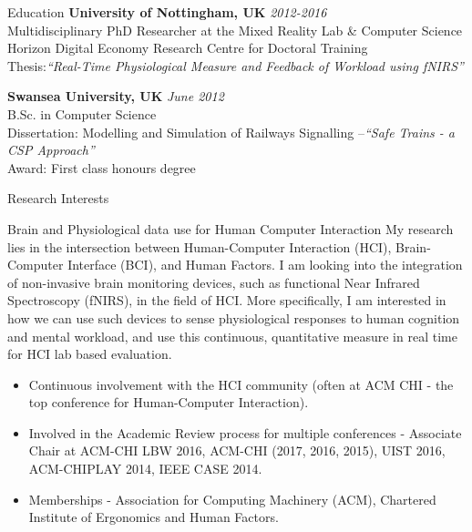 \documentclass{resume} %
\begin{document}

\begin{rSection}{Education}
{\bf University of Nottingham, UK} \hfill {\em 2012-2016} \\
Multidisciplinary PhD Researcher at the Mixed Reality Lab \& Computer Science \\
Horizon Digital Economy Research Centre for Doctoral Training \\
Thesis:\emph{``Real-Time Physiological Measure and Feedback of Workload using fNIRS''} \smallskip \\
\vspace{-1 mm}

{\bf Swansea University, UK} \hfill {\em June 2012} \\
B.Sc. in Computer Science \\
Dissertation: Modelling and Simulation of Railways Signalling –\emph{``Safe Trains - a CSP Approach''}\smallskip \\
Award: First class honours degree

\end{rSection}

\begin{rSection}{Research Interests}
\begin{rSubsection}{Brain and Physiological data use for Human Computer Interaction}{ }{ }{ }
\vspace{-5 mm}
My research lies in the intersection between Human-Computer Interaction (HCI), Brain-Computer
Interface (BCI), and Human Factors. I am looking into the integration of non-invasive
brain monitoring devices, such as functional Near Infrared Spectroscopy (fNIRS), in the field of HCI.
More specifically, I am interested in how we can use such devices to sense physiological responses to
human cognition and mental workload, and use this continuous, quantitative measure in real time for HCI lab based evaluation.

\begin{itemize}
  \item Continuous involvement with the HCI community (often at ACM CHI - the top conference for Human-Computer Interaction).
  \item Involved in the Academic Review process for multiple conferences - Associate Chair at ACM-CHI LBW 2016, ACM-CHI (2017, 2016, 2015), UIST 2016, ACM-CHIPLAY 2014, IEEE CASE 2014.
  \item  Memberships - Association for Computing Machinery (ACM), Chartered Institute of Ergonomics and Human Factors.
\end{itemize}

\end{rSubsection}

\end{rSection}
\end{document}
